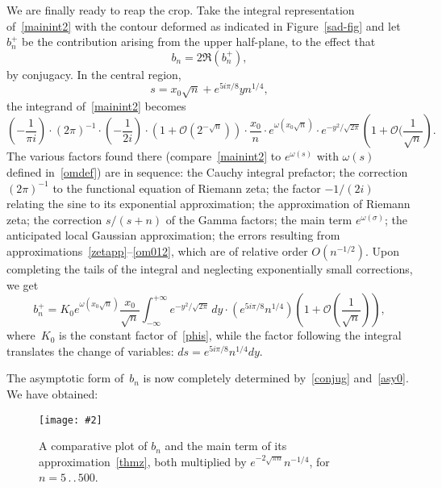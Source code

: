 \documentclass{amsart}
\newcommand{\Img}[2]{\texttt{[image: \#2]}}
\begin{document}
We are finally ready to reap the crop. Take the integral representation
of~\eqref{mainint2} with the contour deformed as indicated in Figure~\ref{sad-fig} and
let $b_n^{+}$ be the contribution arising from the upper half-plane, to
the effect that
\begin{equation}\label{conjug}
b_n=2\Re(b_n^+),
\end{equation}
by conjugacy. In the central region, 
\[
s=x_0\sqrt{n}+e^{5i\pi/8}yn^{1/4},
\]
the integrand of~\eqref{mainint2} becomes
\begin{equation}\label{phis}
\left(-\frac{1}{\pi i}\right)\cdot 
(2\pi)^{-1}\cdot 
\left(-\frac{1}{2i}\right)\cdot
 \left(1+\mathcal{O}(2^{-\sqrt{n}})\right)\cdot 
\frac{x_0}{n} \cdot e^{\omega(x_0\sqrt{n})} \cdot
e^{-y^2/\sqrt{2\pi}}\left(1+\mathcal{O}(\frac{1}{\sqrt{n}}\right).
\end{equation}
The various factors found there (compare~\eqref{mainint2} to $e^{\omega(s)}$
with $\omega(s)$ defined in~\eqref{omdef})
are in sequence: the Cauchy integral prefactor; 
the correction $(2\pi)^{-1}$ to the functional equation of Riemann zeta;
the factor $-1/(2i)$ relating the sine to its
exponential approximation; the approximation of Riemann zeta;
the correction $s/(s+n)$ of the Gamma factors; 
the main term $e^{\omega(\sigma)}$;
the anticipated local Gaussian approximation;
the errors resulting from approximations~\eqref{zetapp}--\eqref{om012},
which are of relative order $O(n^{-1/2})$. Upon completing the tails of the 
integral and neglecting exponentially small corrections,
we get
\begin{equation}\label{asy0}
b_n^+ =K_0 e^{\omega(x_0\sqrt{n})}
\frac{x_0}{\sqrt{n}}
\int_{-\infty}^{+\infty} e^{-y^2/\sqrt{2\pi}}\,dy
\cdot\left(e^{5i\pi/8}n^{1/4}\right)\left(1+\mathcal{O}\left(\frac{1}{\sqrt{n}}\right)\right),
\end{equation}
where~$K_0$    is the constant  factor  of~\eqref{phis}, while the factor
following   the integral   translates the   change   of   variables:
$ds=e^{5i\pi/8}n^{1/4}dy$. 

The  asymptotic form of~$b_n$ is now completely
determined by~\eqref{conjug} and~\eqref{asy0}.
We have obtained:

\begin{figure}
\begin{center}
\Img{7}{comparapp.jpg}
\end{center}
\caption{\label{comparapp-fig} A comparative plot of $b_n$ and 
the main term of its approximation~\eqref{thmz},
both multiplied by $e^{-2\sqrt{\pi n}}n^{-1/4}$, for $n=5\,.\,.\,500$.}
\end{figure}
\end{document}
